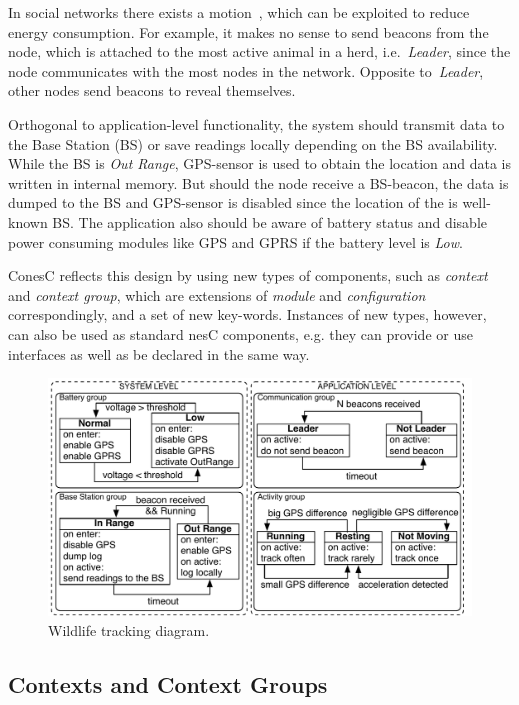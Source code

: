 In social networks there exists a motion~\cite{pasztor10}, which can be exploited to
reduce energy consumption. For example, it makes no sense to send beacons
from the node, which is attached to the most active animal in a herd, i.e.~\emph{Leader},
since the node communicates with the most nodes in the network. Opposite to~\emph{Leader},
other nodes send beacons to reveal themselves.

Orthogonal to application-level functionality, the system should transmit data to
the Base Station (BS) or save readings locally depending on the BS
availability. While the BS is \emph{Out Range}, GPS-sensor is used to
obtain the location and data is written in internal memory. But should the node
receive a BS-beacon, the data is dumped to the BS and GPS-sensor is disabled
since the location of the is well-known BS. The application also should be aware
of battery status and disable power consuming modules like GPS and GPRS if the
battery level is \emph{Low}.

ConesC reflects this design by using new types of components, such as
\emph{context} and \emph{context group}, which are extensions of \emph{module} and
\emph{configuration} correspondingly, and a set of new key-words.
Instances of new types, however, can also be used as standard nesC components,
e.g. they can provide or use interfaces as well as be declared in the same way.

\begin{figure}[!h]
\centering
\includegraphics[width=\columnwidth]{pdf/wildlifetracking}
\caption{Wildlife tracking diagram.}
\label{fig:wtd}
\end{figure}

\subsection{Contexts and Context Groups}\label{subsec:components}

